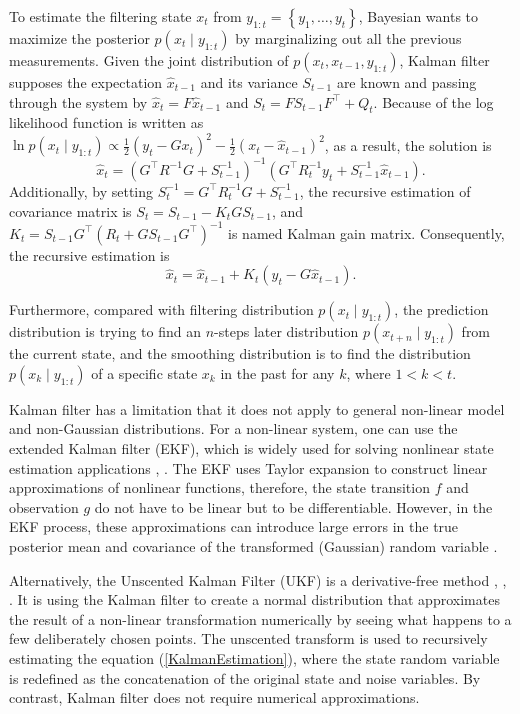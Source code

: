 To estimate the filtering state $x_t$ from $y_{1:t}=\left\lbrace y_1,\ldots,y_t\right\rbrace$, Bayesian wants to maximize the posterior $p(x_t\mid y_{1:t})$ by marginalizing out all the previous measurements. Given the joint distribution of $p(x_t,x_{t-1},y_{1:t})$, Kalman filter supposes the expectation $\hat{x}_{t-1}$ and its variance $S_{t-1}$ are known and passing through the system by $\hat{x}_t=F\hat{x}_{t-1}$ and $S_t=FS_{t-1}F^\top + Q_t$. Because of the log likelihood function is written as
$\ln p(x_t\mid y_{1:t}) \propto \frac{1}{2}(y_t-Gx_t)^2-\frac{1}{2}(x_t-\hat{x}_{t-1})^2$,
as a result, the solution is 
\begin{equation*}
\hat{x}_t = \left(G^\top R^{-1}G+S_{t-1}^{-1}\right)^{-1}\left( G^\top R_t^{-1}y_t+S_{t-1}^{-1}\hat{x}_{t-1} \right).
\end{equation*}
Additionally, by setting $S_t^{-1} = G^\top R_t^{-1}G+S_{t-1}^{-1}$, the recursive estimation of covariance matrix is $S_t = S_{t-1} - K_t GS_{t-1}$, 
and $K_t = S_{t-1} G^\top (R_t +GS_{t-1}G^\top)^{-1}$ is named Kalman gain matrix. Consequently, the recursive estimation is 
\begin{equation}\label{KalmanEstimation}
\hat{x}_t = \hat{x}_{t-1}+K_t(y_t-G\hat{x}_{t-1}).
\end{equation}

Furthermore, compared with filtering distribution $p(x_t\mid y_{1:t})$, the prediction distribution is trying to find an $n$-steps later distribution $p(x_{t+n}\mid y_{1:t})$ from the current state, and the smoothing distribution is to find the distribution $p(x_k\mid y_{1:t})$ of a specific state $x_k$ in the past for any $k$, where $1<k<t$. 

Kalman filter has a limitation that it does not apply to general non-linear model and non-Gaussian distributions. For a non-linear system, one can use the extended Kalman filter (EKF), which is widely used for solving nonlinear state estimation applications \cite{gelb1974applied}, \cite{bar1993estimation}. The EKF uses Taylor expansion to construct linear approximations of nonlinear functions, therefore, the state transition $f$ and observation $g$ do not have to be linear but to be differentiable. However, in the EKF process, these approximations can introduce large errors in the true posterior mean and covariance of the transformed (Gaussian) random variable \cite{wan2000unscented}. 

Alternatively, the Unscented Kalman Filter (UKF) is a derivative-free method \cite{julier1997new}, \cite{wan2000unscented}, \cite{gyorgy2014unscented}. It is using the Kalman filter to create a normal distribution that approximates the result of a non-linear transformation numerically by seeing what happens to a few deliberately chosen points. The unscented transform is used to recursively estimating the equation (\ref{KalmanEstimation}), where the state random variable is redefined as the concatenation of the original state and noise variables. By contrast, Kalman filter does not require numerical approximations. 


